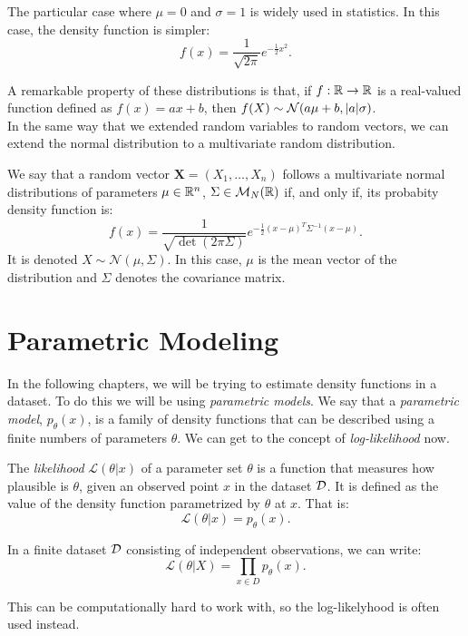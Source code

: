 The particular case where $\mu = 0$ and $\sigma = 1$ is widely used in statistics. In this case, the density function is simpler:
\[
f(x) = \frac{1}{\sqrt{2\pi}}e^{-\frac{1}{2}x^2}.
\]

A remarkable property of these distributions is that, if $f : \mathbb{R} \to \mathbb{R}$ is a real-valued function defined 
as $f(x) = ax+b$, then $f(X) \sim \mathcal N (a\mu + b, \lvert a\rvert \sigma)$.\\

In the same way that we extended random variables to random vectors, we can extend the normal distribution to a multivariate
random distribution.

\begin{ndef}
We say that a random vector $\bm{X} = (X_1,\dots,X_n)$ follows a multivariate normal distributions of parameters
$\mu \in \mathbb{R}^n$, $\Sigma \in \mathcal M_N(\mathbb{R})$ if, and only if, its probabity density function is:
\[
f(x) = \frac{1}{\sqrt{\det(2\pi \Sigma)}}e^{-\frac{1}{2}(x - \mu )^T \Sigma^{-1} (x-\mu)}.
\]
It is denoted $X \sim \mathcal N(\mu, \Sigma)$.
In this case, $\mu$ is the mean vector of the distribution and $\Sigma$ denotes the covariance matrix.  
\end{ndef}


\section{Parametric Modeling}

In the following chapters, we will be trying to estimate density functions in a dataset. To do this we will be using \emph{parametric models}. We say that a \emph{parametric model}, $p_\theta(x)$, 
is a family of density functions that can be described using a finite numbers of parameters $\theta$. We can get to the concept of \emph{log-likelihood} now.

\begin{ndef}
The \emph{likelihood} $\mathcal L(\theta | x)$ of a parameter set $\theta$ is a function that measures how plausible is $\theta$, given an observed point $x$ in the dataset $\mathcal{D}$. It is defined as the value of the 
density function parametrized by $\theta$ at $x$. That is:
$$
\mathcal L(\theta|x) = p_\theta(x).
$$
\end{ndef}

In a finite dataset $\mathcal{D}$ consisting of independent observations, we can write:
\[
\mathcal L(\theta | X) = \prod_{x \in D} p_\theta(x).
\]

This can be computationally hard to work with, so the log-likelyhood is often used instead.

